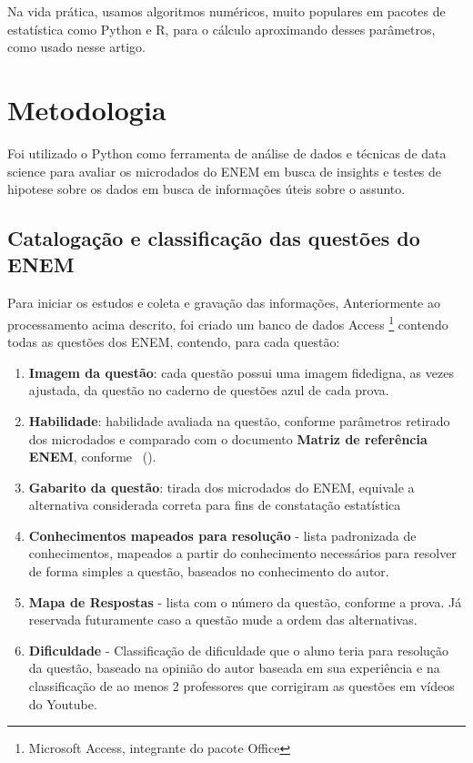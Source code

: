 \documentclass[
	article,			%
	11pt,				%
	oneside,			%
	a4paper,			%
	english,			%
	brazil,				%
	sumario=tradicional
]{abntex2}
\newcommand{\citeaa}[1]{\citeauthoronline{#1}~(\citeyear{#1})}
\begin{document}
			Na vida prática, usamos algoritmos numéricos, muito populares em pacotes de estatística como Python e R, para o cálculo aproximando desses parâmetros, como usado nesse artigo. 
			
	\section{Metodologia}
		
		Foi utilizado o Python como ferramenta de análise de dados e técnicas de data science para avaliar os microdados do ENEM em busca de insights e testes de hipotese sobre os dados em busca de informações úteis sobre o assunto.

		\subsection{Catalogação e classificação das questões do ENEM}
			Para iniciar os estudos e coleta e gravação das informações, Anteriormente ao processamento acima descrito, foi criado um banco de dados Access \footnote{Microsoft Access, integrante do pacote Office} contendo todas as questões dos ENEM, contendo, para cada questão:
			\begin{enumerate}
				\item \textbf{Imagem da questão}: cada questão possui uma imagem fidedigna, as vezes ajustada, da questão no caderno de questões azul de cada prova.
				
				\item \textbf{Habilidade}: habilidade avaliada na questão, conforme parâmetros retirado dos microdados e comparado com o documento \textbf{Matriz de referência ENEM}, conforme \citeaa{INEPMatriz2020}.
				
				\item \textbf{Gabarito da questão}: tirada dos microdados do ENEM, equivale a alternativa considerada correta para fins de constatação estatística
				
				\item \textbf{Conhecimentos mapeados para resolução} - lista padronizada de conhecimentos, mapeados a partir do conhecimento necessários para resolver de forma simples a questão, baseados no conhecimento do autor.
				
				\item \textbf{Mapa de Respostas} - lista com o número da questão, conforme a prova. Já reservada futuramente caso a questão mude a ordem das alternativas.
				
				\item \textbf{Dificuldade} - Classificação de dificuldade que o aluno teria para resolução da questão, baseado na opinião do autor baseada em sua experiência e na classificação de ao menos 2 professores que corrigiram as questões em vídeos do Youtube.

			\end{enumerate}
		
\end{document}
